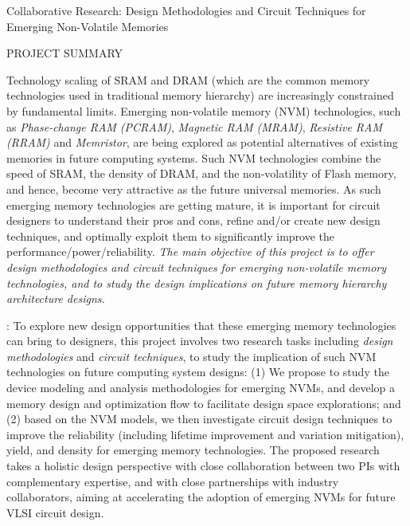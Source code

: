 \documentclass[11pt,letterpaper]{article}
\begin{document}
\begin{center}
{\Large Collaborative Research: Design Methodologies and Circuit Techniques for Emerging Non-Volatile Memories}\\
\end{center}
\begin{center}
{\large  PROJECT SUMMARY} \\
\end{center}

\normalsize
Technology scaling of SRAM and DRAM (which are the common memory technologies used in traditional memory hierarchy) are increasingly constrained by fundamental limits. Emerging non-volatile memory (NVM) technologies, such as \textit{Phase-change RAM (PCRAM)}, \textit{Magnetic RAM (MRAM)},  \textit{Resistive RAM (RRAM)} and \textit{Memristor}, are being explored as potential alternatives of existing memories in future computing systems. Such NVM technologies combine the speed of SRAM, the density of DRAM, and the non-volatility of Flash memory, and hence, become very attractive as the future universal memories.
As such emerging memory technologies are getting mature, it is important for circuit designers to understand their pros and cons, refine and/or create new design techniques, and optimally exploit them to significantly improve the performance/power/reliability. \textit{The main objective of this project is to offer design methodologies and circuit techniques for emerging non-volatile memory technologies, and to study the design implications on future memory hierarchy architecture designs.}

{}:
To explore new design opportunities that these emerging memory technologies can bring to designers,  this project involves two research tasks including \emph{design methodologies} and \emph{circuit techniques}, to study the implication of such NVM technologies on future computing system designs: (1) We propose to study the device modeling and analysis methodologies for emerging NVMs, and develop a memory design and optimization flow to facilitate design space explorations; and (2) based on the NVM models, we then investigate circuit design techniques to improve the reliability (including lifetime improvement and variation mitigation), yield, and density for emerging memory technologies. The proposed research takes a holistic design perspective with close collaboration between two PIs with complementary expertise, and with close partnerships with industry collaborators, aiming at accelerating the adoption of emerging NVMs for future VLSI circuit design.
\end{document}
